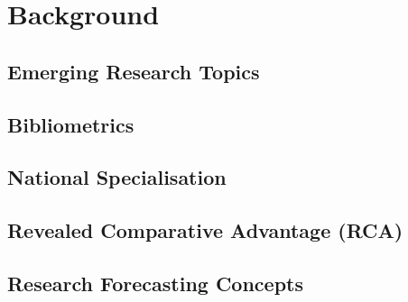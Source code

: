 \chapter{Background} \label{chap:background}

\section{Emerging Research Topics}

\section{Bibliometrics}

\section{National Specialisation}

\section{Revealed Comparative Advantage (RCA)}

\section{Research Forecasting Concepts}
